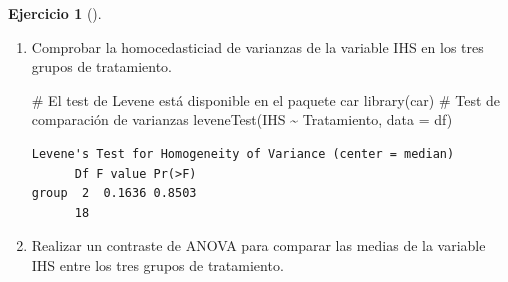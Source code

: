 \documentclass[
  spanish,
  a4paper,
]{scrreport}
\newenvironment{Shaded}{\begin{snugshade}}{\end{snugshade}}
\newcommand{\AttributeTok}[1]{\textcolor[rgb]{0.40,0.45,0.13}{#1}}
\newcommand{\CommentTok}[1]{\textcolor[rgb]{0.37,0.37,0.37}{#1}}
\newcommand{\FunctionTok}[1]{\textcolor[rgb]{0.28,0.35,0.67}{#1}}
\newcommand{\NormalTok}[1]{\textcolor[rgb]{0.00,0.23,0.31}{#1}}
\newcommand{\SpecialCharTok}[1]{\textcolor[rgb]{0.37,0.37,0.37}{#1}}
\theoremstyle{definition}
\newtheorem{exercise}{Ejercicio}[chapter]
\theoremstyle{definition}
\theoremstyle{remark}
\begin{document}
\begin{exercise}[]
\begin{enumerate}
\begin{tcolorbox}
\begin{verbatim}
# A tibble: 3 x 3
  Tratamiento  `Estadístico W` `p-valor`
  <fct>                  <dbl>     <dbl>
1 Control                0.837    0.0928
2 Dexametasona           0.976    0.939 
3 Kanamicina             0.908    0.383 
\end{verbatim}

  \end{tcolorbox}
\item
  Comprobar la homocedasticiad de varianzas de la variable IHS en los
  tres grupos de tratamiento.

  \begin{tcolorbox}[enhanced jigsaw, arc=.35mm, bottomrule=.15mm, bottomtitle=1mm, breakable, colback=white, colbacktitle=quarto-callout-note-color!10!white, colframe=quarto-callout-note-color-frame, coltitle=black, left=2mm, leftrule=.75mm, opacityback=0, opacitybacktitle=0.6, rightrule=.15mm, title=\textcolor{quarto-callout-note-color}{\faInfo}\hspace{0.5em}{Solución}, titlerule=0mm, toprule=.15mm, toptitle=1mm]

\begin{Shaded}
\begin{Highlighting}[]
\CommentTok{\# El test de Levene está disponible en el paquete car}
\FunctionTok{library}\NormalTok{(car)}
\CommentTok{\# Test de comparación de varianzas}
\FunctionTok{leveneTest}\NormalTok{(IHS }\SpecialCharTok{\textasciitilde{}}\NormalTok{ Tratamiento, }\AttributeTok{data =}\NormalTok{ df)}
\end{Highlighting}
\end{Shaded}

\begin{verbatim}
Levene's Test for Homogeneity of Variance (center = median)
      Df F value Pr(>F)
group  2  0.1636 0.8503
      18               
\end{verbatim}

  \end{tcolorbox}
\item
  Realizar un contraste de ANOVA para comparar las medias de la variable
  IHS entre los tres grupos de tratamiento.

  \begin{tcolorbox}[enhanced jigsaw, arc=.35mm, bottomrule=.15mm, bottomtitle=1mm, breakable, colback=white, colbacktitle=quarto-callout-note-color!10!white, colframe=quarto-callout-note-color-frame, coltitle=black, left=2mm, leftrule=.75mm, opacityback=0, opacitybacktitle=0.6, rightrule=.15mm, title=\textcolor{quarto-callout-note-color}{\faInfo}\hspace{0.5em}{Solución}, titlerule=0mm, toprule=.15mm, toptitle=1mm]


\end{tcolorbox}
\end{enumerate}
\end{exercise}
\end{document}
